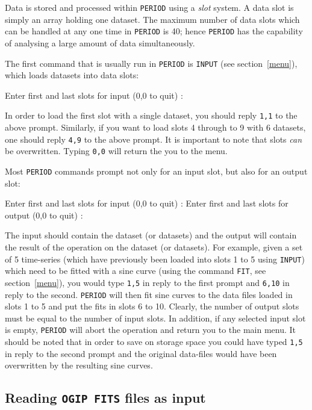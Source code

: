 \documentclass[twoside,11pt,noabs,nolof]{starlink}
\begin{document}
Data is stored and processed within \texttt{PERIOD} using a \emph{slot} system.
A data slot is simply an array holding one dataset. The maximum number
of data slots which can be handled at any one time in \texttt{PERIOD} is 40;
hence \texttt{PERIOD} has the capability of analysing a large amount of data
simultaneously.

The first command that is usually run in \texttt{PERIOD} is \texttt{INPUT}
(see section~\ref{menu}), which loads datasets into data slots:

\begin{terminalv}
Enter first and last slots for input (0,0 to quit) :
\end{terminalv}

In order to load the first slot with a single dataset, you should reply
\texttt{1,1} to the above prompt. Similarly, if you want to load slots
4 through to 9 with 6 datasets, one should reply \texttt{4,9} to the above
prompt. It is important to note that slots \emph{can} be overwritten.
Typing \texttt{0,0} will return the you to the menu.

Most \texttt{PERIOD} commands prompt not only for an input slot, but also for
an output slot:

\begin{terminalv}
Enter first and last slots for input  (0,0 to quit) :
Enter first and last slots for output (0,0 to quit) :
\end{terminalv}

The input should contain the dataset (or datasets) and the output will
contain the result of the operation on the dataset (or datasets). For
example, given a set of 5 time-series (which have previously been
loaded into slots 1 to 5 using \texttt{INPUT}) which need to be fitted
with a sine curve (using the command \texttt{FIT}, see
section~\ref{menu}), you would type \texttt{1,5} in reply to the first
prompt and \texttt{6,10} in reply to the second. \texttt{PERIOD} will then
fit sine curves to the data files loaded in slots 1 to 5 and put the
fits in slots 6 to 10. Clearly, the number of output slots must be
equal to the number of input slots. In addition, if any selected input
slot is empty, \texttt{PERIOD} will abort the operation and return you to
the main menu. It should be noted that in order to save on storage
space you could have typed \texttt{1,5} in reply to the second prompt and
the original data-files would have been overwritten by the resulting
sine curves.

\subsection{Reading \texttt{OGIP FITS} files as input}
\label{slots2}
\end{document}
